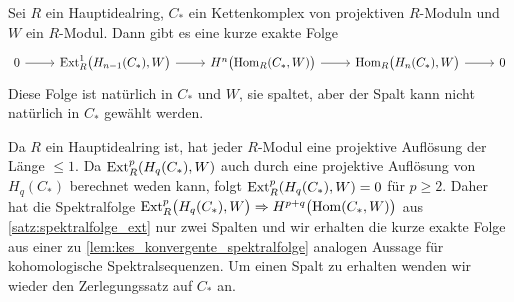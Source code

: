\begin{satz}[label=satz:ext_kettenkompl_kef,name={Universelles Koeffizienten-Theorem für Kohomologie von Kettenkomplexen}]
	Sei $R$ ein Hauptidealring, $C_*$ ein Kettenkomplex von projektiven $R$-Moduln und $W$ ein $R$-Modul.
	Dann gibt es eine kurze exakte Folge
	\[
		\begin{tikzcd}
			0 \rar & \Ext_R^1 \enbrace[\big]{H_{n-1}(C_*),W} \rar & H^n \enbrace[\big]{\Hom_R(C_*,W)} \rar & \Hom_R \enbrace[\big]{H_n(C_*),W} \rar & 0
		\end{tikzcd}
	\]
	Diese Folge ist natürlich in $C_*$ und $W$, sie spaltet, aber der Spalt kann nicht natürlich in $C_*$ gewählt werden.
\end{satz}
\begin{beweis}
	Da $R$ ein Hauptidealring ist, hat jeder $R$-Modul eine projektive Auflösung der Länge $\le 1$.
	Da $\Ext_R^p \enbrace*{H_q(C_*),W}$ auch durch eine projektive Auflösung von $H_q(C_*)$ berechnet weden kann, folgt $\Ext_R^p \enbrace*{H_q(C_*),W}=0$ für $p \ge 2$.
	Daher hat die Spektralfolge $\Ext_R^p \enbrace[\big]{H_q(C_*),W} \Rightarrow H^{p+q} \enbrace[\big]{\Hom(C_*,W)}$ aus \autoref{satz:spektralfolge_ext} nur zwei Spalten und wir erhalten die kurze exakte Folge aus einer zu \autoref{lem:kes_konvergente_spektralfolge} analogen Aussage für kohomologische Spektralsequenzen.
	Um einen Spalt zu erhalten wenden wir wieder den Zerlegungssatz auf $C_*$ an.
\end{beweis}

